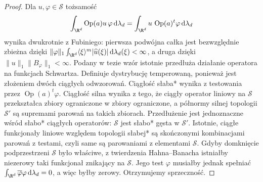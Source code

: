\begin{proof}
Dla $u,\varphi\in\mathcal S$ tożsamość
\[
 \int_{\R^d}\operatorname{Op}(a)u\,\varphi\,\mathrm d\lambda_d
 =\int_{\R^d}u\,\operatorname{Op}(a)^t\varphi\,\mathrm d\lambda_d
\]
wynika dwukrotnie z Fubiniego: pierwsza podwójna
całka jest bezwzględnie zbieżna dzięki
$\|\varphi\|_1\int_{\R^d}\langle\xi\rangle^m
|\widehat u(\xi)|\,\mathrm d\lambda_d(\xi)<\infty$,
a druga dzięki $\|u\|_1\|B_\varphi\|_1<\infty$.
Podany w tezie wzór istotnie przedłuża działanie
operatora na funkcjach Schwartza.
Definiuje dystrybucję temperowaną, ponieważ
jest złożeniem dwóch ciągłych odwzorowań.
Ciągłość słaba* wynika z testowania przez
$\operatorname{Op}(a)^t\varphi$. Ciągłość silna
wynika z tego, że ciągły operator liniowy
na $\mathcal S$ przekształca zbiory ograniczone
w zbiory ograniczone, a półnormy silnej topologii
$\mathcal S'$ są supremami parowań na takich zbiorach.
Przedłużenie jest jednoznaczne wśród słabo*
ciągłych operatorów: $\mathcal S$ jest słabo*
gęsta w $\mathcal S'$.
Istotnie, ciągłe funkcjonały liniowe względem
topologii słabej* są skończonymi kombinacjami
parowań z testami, czyli same są parowaniami
z elementami $\mathcal S$.
Gdyby domknięcie podprzestrzeni $\mathcal S$
było właściwe, z twierdzenia Hahna--Banacha
istniałby niezerowy taki funkcjonał znikający
na $\mathcal S$. Jego test $\varphi$ musiałby
jednak spełniać
$\int_{\R^d}\overline\varphi\varphi\,\mathrm d\lambda_d=0$,
a więc byłby zerowy. Otrzymujemy sprzeczność.
\end{proof}

